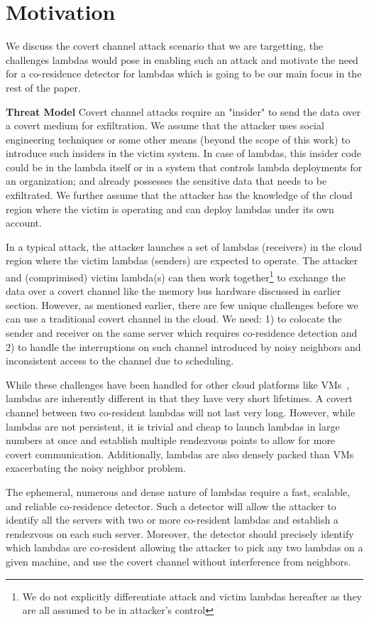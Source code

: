 
\section{Motivation}
\label{sec:motivation}

We discuss the covert channel attack scenario that we are targetting, the challenges 
lambdas would pose in enabling such an attack and motivate the need for a 
co-residence detector for lambdas which is going to be our main focus in the rest of 
the paper. 

\textbf{Threat Model}
Covert channel attacks require an "insider" to send the data over a covert 
medium for exfiltration. We assume that the attacker uses social engineering 
techniques or some other means (beyond the scope of this work) to introduce  
such insiders in the victim system. In case of lambdas, this insider code could be 
in the lambda itself or in a system that controls lambda deployments for an 
organization; and already possesses the sensitive data that needs to be exfiltrated. 
We further assume that the attacker has the knowledge of the cloud region 
where the victim is operating and can deploy lambdas under its own account.

In a typical attack, the attacker launches a set of  lambdas (receivers) in the 
cloud region where the victim lambdas 
(senders) are expected to operate. The attacker and 
(comprimised) victim lambda(s) can then work together\footnote{We do not explicitly
differentiate attack and victim lambdas hereafter as they are all assumed 
to be in attacker's control} to exchange the data over 
a covert channel like the memory bus hardware discussed in earlier section.
However, as mentioned earlier, there are few unique challenges before we can use
a traditional covert channel in the cloud. We need: 1) to colocate the sender 
and receiver on the same server which requires co-residence detection and 2) to handle
the interruptions on such channel introduced by noisy neighbors and inconsistent 
access to the channel due to scheduling.

While these challenges have been handled for other cloud platforms like 
VMs~\cite{varad191016,wuusenix2012}, 
lambdas are inherently different in that 
they have very short lifetimes. A covert
channel between two co-resident lambdas will not last very long. However, while
lambdas are not persistent, it is trivial and cheap to launch lambdas in large numbers at
once and establish multiple rendezvous points to allow for more covert communication.
Additionally, lambdas are also densely packed than VMs
exacerbating the noisy neighbor problem.

The ephemeral, numerous and dense nature of lambdas require a fast,
scalable, and reliable co-residence detector. Such a  
detector will allow the attacker to identify all the servers with two or more 
co-resident lambdas and establish a rendezvous on each such server. 
Moreover, the detector should precisely identify which lambdas are co-resident 
allowing the attacker to pick any two lambdas on a given machine, 
and use the covert channel without interference from neighbors. 


